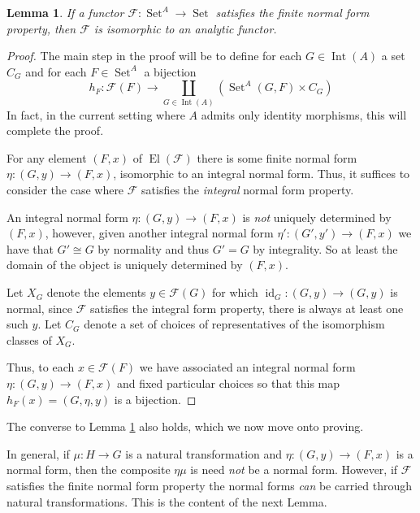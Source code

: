 \documentclass[12pt]{article}
\theoremstyle{plain}
\newtheorem{lemma}[thm]{Lemma}
\theoremstyle{definition}
\newcommand{\scr}[1]{\mathscr{#1}}
\newcommand{\lto}{\longrightarrow}
\DeclareMathOperator{\set}{Set}
\begin{document}
	\begin{lemma}\label{lem:normal_form_prop--->analytic}
		If a functor $\scr{F}: \set^A \lto \set$ satisfies the finite normal form property, then $\scr{F}$ is isomorphic to an analytic functor.
		\end{lemma}
	\begin{proof}
		The main step in the proof will be to define for each $G \in \operatorname{Int}(A)$ a set $C_G$ and for each $F \in \set^A$ a bijection
		\begin{equation}\label{eq:bijection}
			h_F: \scr{F}(F) \lto \coprod_{G \in \operatorname{Int}(A)}(\operatorname{Set}^A(G, F) \times C_G)
			\end{equation}
		In fact, in the current setting where $A$ admits only identity morphisms, this will complete the proof.
		
		For any element $(F,x)$ of $\operatorname{El}(\scr{F})$ there is some finite normal form $\eta: (G,y) \lto (F,x)$, isomorphic to an integral normal form. Thus, it suffices to consider the case where $\scr{F}$ satisfies the \emph{integral} normal form property.
		
		An integral normal form $\eta: (G,y) \lto (F,x)$ is \emph{not} uniquely determined by $(F,x)$, however, given another integral normal form $\eta': (G',y') \lto (F,x)$ we have that $G' \cong G$ by normality and thus $G' = G$ by integrality. So at least the domain of the object is uniquely determined by $(F,x)$.
		
		Let $X_G$ denote the elements $y \in \scr{F}(G)$ for which $\operatorname{id}_G: (G,y) \lto (G,y)$ is normal, since $\scr{F}$ satisfies the integral form property, there is always at least one such $y$. Let $C_G$ denote a set of choices of representatives of the isomorphism classes of $X_G$.
				
		Thus, to each $x \in \scr{F}(F)$ we have associated an integral normal form $\eta: (G, y) \lto (F,x)$ and fixed particular choices so that this map $h_F(x) = (G, \eta, y)$ is a bijection.
		\end{proof}

The converse to Lemma \ref{lem:normal_form_prop--->analytic} also holds, which we now move onto proving.

In general, if $\mu: H \lto G$ is a natural transformation and $\eta: (G, y) \lto (F, x)$ is a normal form, then the composite $\eta \mu$ is need \emph{not} be a normal form. However, if $\scr{F}$ satisfies the finite normal form property the normal forms \emph{can} be carried through natural transformations. This is the content of the next Lemma.
 
\end{document}

